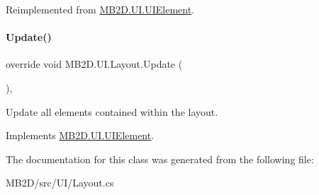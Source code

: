 Reimplemented from \hyperlink{class_m_b2_d_1_1_u_i_1_1_u_i_element_afec98e6e38cb0dbc17a5db6d6a3d5ba5}{M\+B2\+D.\+U\+I.\+U\+I\+Element}.

\hypertarget{class_m_b2_d_1_1_u_i_1_1_layout_a88af7d81c8eecdca29c04e2616b69c0c}{}\label{class_m_b2_d_1_1_u_i_1_1_layout_a88af7d81c8eecdca29c04e2616b69c0c} 
\paragraph{\texorpdfstring{Update()}{Update()}}
{\footnotesize\ttfamily override void M\+B2\+D.\+U\+I.\+Layout.\+Update (\begin{DoxyParamCaption}{ }\end{DoxyParamCaption})\hspace{0.3cm}{\ttfamily [inline]}, {\ttfamily [virtual]}}



Update all elements contained within the layout. 



Implements \hyperlink{class_m_b2_d_1_1_u_i_1_1_u_i_element_aa97bcbe44f3fac8a13e2febca23b2d4d}{M\+B2\+D.\+U\+I.\+U\+I\+Element}.



The documentation for this class was generated from the following file\+:\begin{DoxyCompactItemize}
\item 
M\+B2\+D/src/\+U\+I/Layout.\+cs\end{DoxyCompactItemize}
